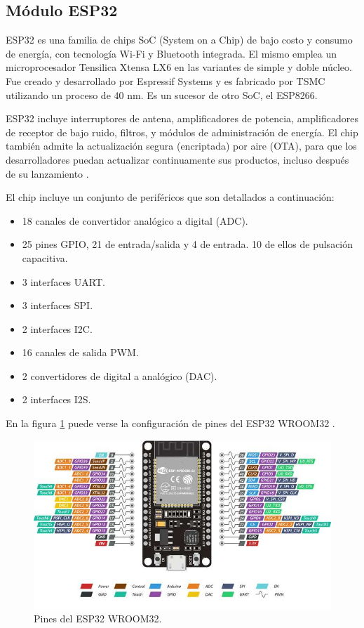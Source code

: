 \subsection{Módulo ESP32}

ESP32 es una familia de chips SoC (System on a Chip) de bajo costo y consumo de energía, con tecnología Wi-Fi y Bluetooth integrada. El mismo emplea un microprocesador Tensilica Xtensa LX6 en las variantes de simple y doble núcleo. Fue creado y desarrollado por Espressif Systems y es fabricado por TSMC utilizando un proceso de 40 nm. Es un sucesor de otro SoC, el ESP8266. 

ESP32 incluye interruptores de antena, amplificadores de potencia, amplificadores de receptor de bajo ruido, filtros, y módulos de administración de energía. El chip también admite la actualización segura (encriptada) por aire (OTA), para que los desarrolladores puedan actualizar continuamente sus productos, incluso después de su lanzamiento \citep{WEBSITE:esp21wroom}. 

El chip incluye un conjunto de periféricos que son detallados a continuación:
\begin{itemize}
\item 18 canales de convertidor analógico a digital (ADC).
\item 25 pines GPIO, 21 de entrada/salida y 4 de entrada. 10 de ellos de pulsación capacitiva.
\item 3 interfaces UART.
\item 3 interfaces SPI.
\item 2 interfaces I2C.
\item 16 canales de salida PWM.
\item 2 convertidores de digital a analógico (DAC).
\item 2 interfaces I2S.
\end{itemize}


En la figura \ref{fig:esp32} puede verse la configuración de pines del ESP32 WROOM32 \citep{WEBSITE:pinesESP32}.

\begin{figure}[ht]
	\centering
	\includegraphics[width=1\textwidth]{./Figures/esp32.png}
	\caption{Pines del ESP32 WROOM32.}
	\label{fig:esp32}
\end{figure} 


